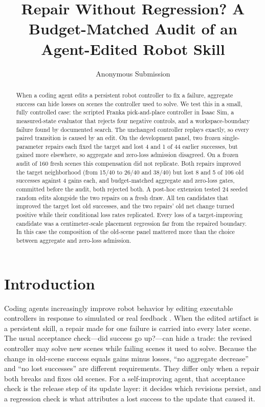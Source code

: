 \documentclass[letterpaper]{article} %
\title{Repair Without Regression? A Budget-Matched Audit of an Agent-Edited Robot Skill}
\author{
    Anonymous Submission
}
\begin{document}
\maketitle

\begin{abstract}
When a coding agent edits a persistent robot controller to fix a failure, aggregate success can hide losses on scenes the controller used to solve. We test this in a small, fully controlled case: the scripted Franka pick-and-place controller in Isaac Sim, a measured-state evaluator that rejects four negative controls, and a workspace-boundary failure found by documented search. The unchanged controller replays exactly, so every paired transition is caused by an edit. On the development panel, two frozen single-parameter repairs each fixed the target and lost 4 and 1 of 44 earlier successes, but gained more elsewhere, so aggregate and zero-loss admission disagreed. On a frozen audit of 160 fresh scenes this compensation did not replicate. Both repairs improved the target neighborhood (from 15/40 to 26/40 and 38/40) but lost 8 and 5 of 106 old successes against 4 gains each, and budget-matched aggregate and zero-loss gates, committed before the audit, both rejected both. A post-hoc extension tested 24 seeded random edits alongside the two repairs on a fresh draw. All ten candidates that improved the target lost old successes, and the two repairs' old net change turned positive while their conditional loss rates replicated. Every loss of a target-improving candidate was a centimeter-scale placement regression far from the repaired boundary. In this case the composition of the old-scene panel mattered more than the choice between aggregate and zero-loss admission.
\end{abstract}

\section{Introduction}
Coding agents increasingly improve robot behavior by editing executable controllers in response to simulated or real feedback \citep{kuroki2026closedloop,xiao2026enpire,aphale2026selfrepair}. When the edited artifact is a persistent skill, a repair made for one failure is carried into every later scene. The usual acceptance check---did success go up?---can hide a trade: the revised controller may solve new scenes while failing scenes it used to solve. Because the change in old-scene success equals gains minus losses, ``no aggregate decrease'' and ``no lost successes'' are different requirements. They differ only when a repair both breaks and fixes old scenes. For a self-improving agent, that acceptance check is the release step of its update layer: it decides which revisions persist, and a regression check is what attributes a lost success to the update that caused it.
\end{document}
